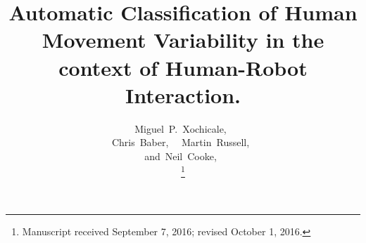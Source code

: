 \documentclass[9pt,journal,onecolumn,compsoc]{IEEEtran}
\begin{document}
%
\title{
  Automatic Classification of  Human Movement Variability  in the context of  Human-Robot Interaction.
}



%
%

\author{
 	Miguel~P.~Xochicale,~\\
         Chris~Baber,~
         ~Martin~Russell,~ \\
         and~Neil~Cooke,~

\thanks{Manuscript received September 7, 2016; revised October 1, 2016.}
}
\end{document}
